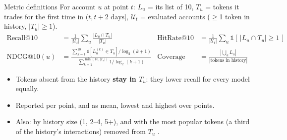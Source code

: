 \documentclass[aspectratio=169,10pt]{beamer}
\newcommand{\toindex}{\hfill\hyperlink{index}{\beamerreturnbutton{index}}}
\begin{document}
\begin{frame}[label=metrics]{Metric definitions \toindex}
  \small
  For account $u$ at point $t$: $L_u$ = its list of 10, $T_u$ = tokens it trades for the first time in $(t, t+2\text{ days}]$, $\mathcal{U}_t$ = evaluated accounts ($\geq$1 token in history, $|T_u|\geq1$).
  \begin{align*}
    \text{Recall@10} &= \frac{1}{|\mathcal{U}_t|}\sum_{u}\frac{|L_u\cap T_u|}{|T_u|}
    &
    \text{HitRate@10} &= \frac{1}{|\mathcal{U}_t|}\sum_{u}\mathbb{1}\left[\,|L_u\cap T_u|\geq1\,\right]
    \\
    \text{NDCG@10}(u) &= \frac{\sum_{k=1}^{10}\mathbb{1}[L_u^{(k)}\in T_u]/\log_2(k+1)}{\sum_{k=1}^{\min(10,|T_u|)}1/\log_2(k+1)}
    &
    \text{Coverage} &= \frac{|\bigcup_u L_u|}{|\text{tokens in history}|}
  \end{align*}
  \begin{itemize}
    \item Tokens absent from the history \textbf{stay in $T_u$}: they lower recall for every model equally.
    \item Reported per point, and as mean, lowest and highest over points.
    \item Also: by history size (1, 2--4, 5+), and with the most popular tokens (a third of the history's interactions) removed from $T_u$ \cite{cremonesi2010}.
  \end{itemize}
\end{frame}
\end{document}
